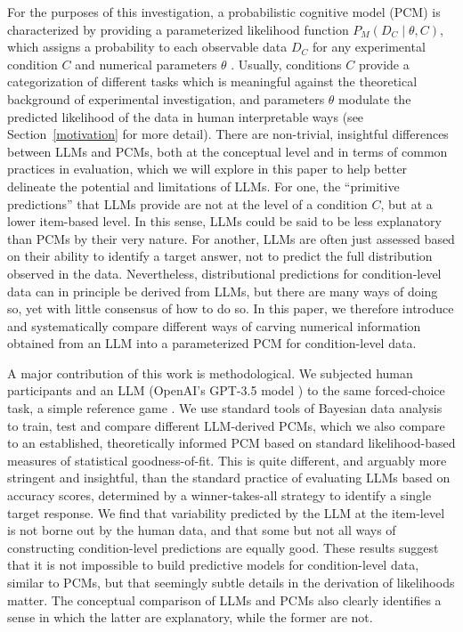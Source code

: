 \documentclass[fleqn]{article}
\begin{document}
For the purposes of this investigation, a probabilistic cognitive model (PCM) is characterized by providing a parameterized likelihood function $P_{M}(D_{C} \mid \theta, C)$, which assigns a probability to each observable data $D_{C}$ for any experimental condition $C$ and numerical parameters $\theta$ \citep{LewandowskyFarrell2011:Computational-M,LeeWagenmakers2013:Bayesian-Cognit}.
Usually, conditions $C$ provide a categorization of different tasks which is meaningful against the theoretical background of experimental investigation, and parameters $\theta$ modulate the predicted likelihood of the data in human interpretable ways (see Section~\ref{motivation} for more detail).
There are non-trivial, insightful differences between LLMs and PCMs, both at the conceptual level and in terms of common practices in evaluation, which we will explore in this paper to help better delineate the potential and limitations of LLMs.
For one, the ``primitive predictions'' that LLMs provide are not at the level of a condition $C$, but at a lower item-based level.
In this sense, LLMs could be said to be less explanatory than PCMs by their very nature.
For another, LLMs are often just assessed based on their ability to identify a target answer, not to predict the full distribution observed in the data.
Nevertheless, distributional predictions for condition-level data can in principle be derived from LLMs, but there are many ways of doing so, yet with little consensus of how to do so.
In this paper, we therefore introduce and systematically compare different ways of carving numerical information obtained from an LLM into a parameterized PCM for condition-level data.

A major contribution of this work is methodological.
We subjected human participants and an LLM (OpenAI's GPT-3.5 model ) to the same forced-choice task, a simple reference game \citep{FrankGoodman2012:Predicting-Prag}.
We use standard tools of Bayesian data analysis \citep{GelmanCarlin2014:Bayesian-Data-A} to train, test and compare different LLM-derived PCMs, which we also compare to an established, theoretically informed PCM based on standard likelihood-based measures of statistical goodness-of-fit.
This is quite different, and arguably more stringent and insightful, than the standard practice of evaluating LLMs based on accuracy scores, determined by a winner-takes-all strategy to identify a single target response.
We find that variability predicted by the LLM at the item-level is not borne out by the human data, and that some but not all ways of constructing condition-level predictions are equally good.
These results suggest that it is not impossible to build predictive models for condition-level data, similar to PCMs, but that seemingly subtle details in the derivation of likelihoods matter.
The conceptual comparison of LLMs and PCMs also clearly identifies a sense in which the latter are explanatory, while the former are not.
\end{document}
